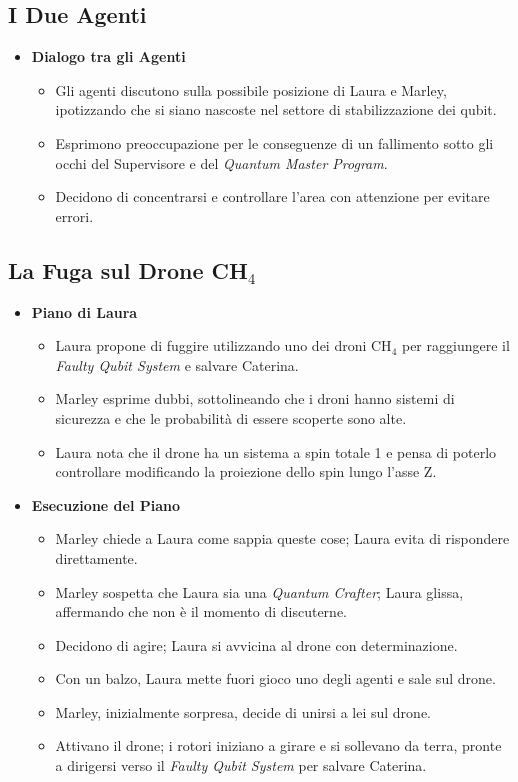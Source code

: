 \subsection*{I Due Agenti}

\begin{itemize}
    \item \textbf{Dialogo tra gli Agenti}
    \begin{itemize}
        \item Gli agenti discutono sulla possibile posizione di Laura e Marley, ipotizzando che si siano nascoste nel settore di stabilizzazione dei qubit.
        \item Esprimono preoccupazione per le conseguenze di un fallimento sotto gli occhi del Supervisore e del \emph{Quantum Master Program}.
        \item Decidono di concentrarsi e controllare l'area con attenzione per evitare errori.
    \end{itemize}
\end{itemize}

\subsection*{La Fuga sul Drone CH$_4$}

\begin{itemize}
    \item \textbf{Piano di Laura}
    \begin{itemize}
        \item Laura propone di fuggire utilizzando uno dei droni CH$_4$ per raggiungere il \emph{Faulty Qubit System} e salvare Caterina.
        \item Marley esprime dubbi, sottolineando che i droni hanno sistemi di sicurezza e che le probabilità di essere scoperte sono alte.
        \item Laura nota che il drone ha un sistema a spin totale 1 e pensa di poterlo controllare modificando la proiezione dello spin lungo l'asse Z.
    \end{itemize}
    \item \textbf{Esecuzione del Piano}
    \begin{itemize}
        \item Marley chiede a Laura come sappia queste cose; Laura evita di rispondere direttamente.
        \item Marley sospetta che Laura sia una \emph{Quantum Crafter}; Laura glissa, affermando che non è il momento di discuterne.
        \item Decidono di agire; Laura si avvicina al drone con determinazione.
        \item Con un balzo, Laura mette fuori gioco uno degli agenti e sale sul drone.
        \item Marley, inizialmente sorpresa, decide di unirsi a lei sul drone.
        \item Attivano il drone; i rotori iniziano a girare e si sollevano da terra, pronte a dirigersi verso il \emph{Faulty Qubit System} per salvare Caterina.
    \end{itemize}
\end{itemize}
